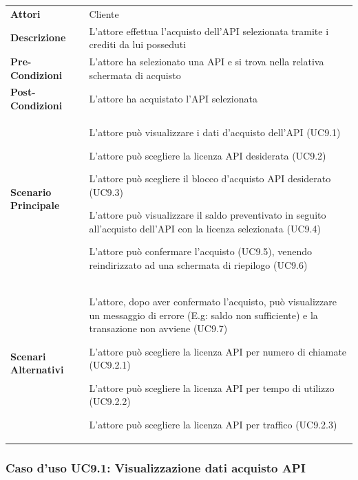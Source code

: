 \begin{longtable}{ l | p{11cm}}
	\hline
	\rowcolor{Gray}
	\multicolumn{2}{c}{UC9 - Acquisto API}\\
	\hline
	\textbf{Attori} & Cliente \\
	\textbf{Descrizione} & L'attore effettua l'acquisto dell'API selezionata tramite i crediti da lui posseduti \\
	\textbf{Pre-Condizioni} & L'attore ha selezionato una API e si trova nella relativa schermata di acquisto \\
	\textbf{Post-Condizioni} & L'attore ha acquistato l'API selezionata \\
	\textbf{Scenario Principale} & 
	\begin{enumerate*}[label=(\arabic*.),itemjoin={\newline}]
		\item L'attore può visualizzare i dati d'acquisto dell'API (UC9.1)
		\item L'attore può scegliere la licenza API desiderata (UC9.2)
		\item L'attore può scegliere il blocco d'acquisto API desiderato (UC9.3)
		\item L'attore può visualizzare il saldo preventivato in seguito all'acquisto dell'API con la licenza selezionata (UC9.4)
		\item L'attore può confermare l'acquisto (UC9.5), venendo reindirizzato ad una schermata di riepilogo (UC9.6)
	\end{enumerate*}\\
	\textbf{Scenari Alternativi} & 
	\begin{enumerate*}[label=(\arabic*.),itemjoin={\newline}]
		\item L'attore, dopo aver confermato l'acquisto, può visualizzare un messaggio di errore (E.g: saldo non sufficiente) e la transazione non avviene (UC9.7)
		\item L'attore può scegliere la licenza API per numero di chiamate (UC9.2.1)
		\item L'attore può scegliere la licenza API per tempo di utilizzo (UC9.2.2)
		\item L'attore può scegliere la licenza API per traffico (UC9.2.3)
	\end{enumerate*}\\
\end{longtable}

\subsubsection{Caso d'uso UC9.1: Visualizzazione dati acquisto API}
\label{UC9_1}

